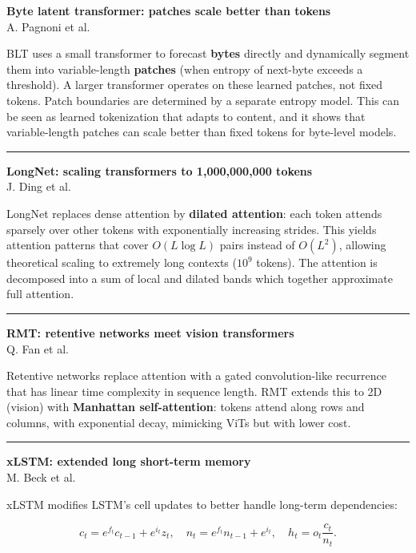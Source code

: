 \documentclass[a5paper]{article}
\begin{document}
\textbf{Byte latent transformer: patches scale better than tokens}\\
A. Pagnoni et al.

BLT uses a small transformer to forecast \textbf{bytes} directly and
dynamically segment them into variable-length \textbf{patches} (when
entropy of next-byte exceeds a threshold). A larger transformer operates
on these learned patches, not fixed tokens. Patch boundaries are
determined by a separate entropy model. This can be seen as learned
tokenization that adapts to content, and it shows that variable-length
patches can scale better than fixed tokens for byte-level models.

\begin{center}\rule{0.5\linewidth}{0.5pt}\end{center}

\textbf{LongNet: scaling transformers to 1,000,000,000 tokens}\\
J. Ding et al.

LongNet replaces dense attention by \textbf{dilated attention}: each
token attends sparsely over other tokens with exponentially increasing
strides. This yields attention patterns that cover $O(L \log L)$ pairs
instead of $O(L^2)$, allowing theoretical scaling to extremely long
contexts ($10^9$ tokens). The attention is decomposed into a sum of local
and dilated bands which together approximate full attention.

\begin{center}\rule{0.5\linewidth}{0.5pt}\end{center}

\textbf{RMT: retentive networks meet vision transformers}\\
Q. Fan et al.

Retentive networks replace attention with a gated convolution-like
recurrence that has linear time complexity in sequence length. RMT
extends this to 2D (vision) with \textbf{Manhattan self-attention}:
tokens attend along rows and columns, with exponential decay, mimicking
ViTs but with lower cost.

\begin{center}\rule{0.5\linewidth}{0.5pt}\end{center}

\textbf{xLSTM: extended long short-term memory}\\
M. Beck et al.

xLSTM modifies LSTM's cell updates to better handle long-term
dependencies:

\[ c_t = e^{f_t} c_{t-1} + e^{i_t} z_t,\quad n_t =
e^{f_t} n_{t-1} + e^{i_t},\quad h_t = o_t
\frac{c_t}{n_t}. \]
\end{document}
